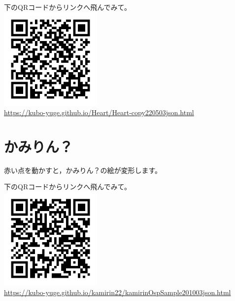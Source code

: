 \documentclass[uplatex,dvipdfmx,a4paper,twoside]{jsarticle}
\begin{document}
\begin{multicols}{2}
下のQRコードからリンクへ飛んでみて。\\

\includegraphics[bb=10 10 220 220,width=50mm,clip]{HeartQR_153914.png}\\

\url{https://kubo-yuge.github.io/Heart/Heart-copy220503json.html}\\

\columnbreak

\section{かみりん？}

赤い点を動かすと，かみりん？の絵が変形します。\par
\begin{layer}{80}{0}
\end{layer}\par
\vspace{11\baselineskip}

下のQRコードからリンクへ飛んでみて。\\

\includegraphics[bb=10 10 220 220,width=50mm,clip]{kamirinQR_157881.png}\\

\url{https://kubo-yuge.github.io/kamirin22/kamirinOspSample201003json.html}\\

\newpage

\end{multicols}
\end{document}
